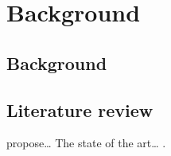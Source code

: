 \chapter{Background}
\label{ch:background}


\section{Background}

\section{Literature review}

\textcite{foo2017} propose… The state of the art… \parencite{foo2017}.

